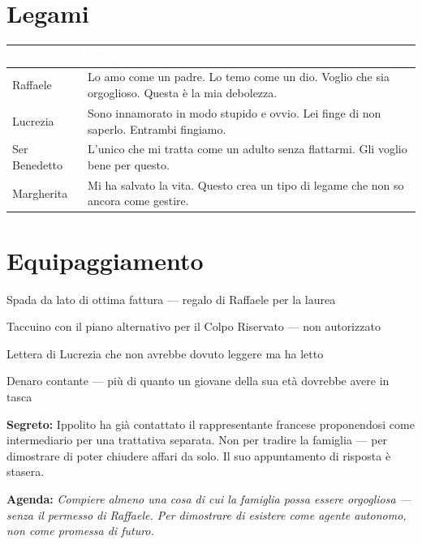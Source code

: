 \section*{Legami}
\begin{table}[h]\centering\renewcommand{\arraystretch}{1.4}
\begin{tabularx}{\linewidth}{@{}L{2.6cm} X@{}}
\toprule{}
\textcolor{white}{\textbf{PG}} & \textcolor{white}{\textbf{Legame}} \\
\midrule
Raffaele & Lo amo come un padre. Lo temo come un dio. Voglio che sia orgoglioso. Questa è la mia debolezza. \\
Lucrezia & Sono innamorato in modo stupido e ovvio. Lei finge di non saperlo. Entrambi fingiamo. \\
Ser Benedetto & L'unico che mi tratta come un adulto senza flattarmi. Gli voglio bene per questo. \\
Margherita & Mi ha salvato la vita. Questo crea un tipo di legame che non so ancora come gestire. \\
\bottomrule
\end{tabularx}
\end{table}

\section*{Equipaggiamento}
\begin{goldlist}
\item Spada da lato di ottima fattura — regalo di Raffaele per la laurea
\item Taccuino con il piano alternativo per il Colpo Riservato — non autorizzato
\item Lettera di Lucrezia che non avrebbe dovuto leggere ma ha letto
\item Denaro contante — più di quanto un giovane della sua età dovrebbe avere in tasca
\end{goldlist}

\clearpage
\begin{secretbox}
\textbf{Segreto:} Ippolito ha già contattato il rappresentante francese proponendosi come intermediario per una trattativa separata. Non per tradire la famiglia — per dimostrare di poter chiudere affari da solo. Il suo appuntamento di risposta è stasera.

\medskip\noindent\textcolor{SecretRed}{\textbf{Agenda:}} \textit{Compiere almeno una cosa di cui la famiglia possa essere orgogliosa — senza il permesso di Raffaele. Per dimostrare di esistere come agente autonomo, non come promessa di futuro.}
\end{secretbox}

